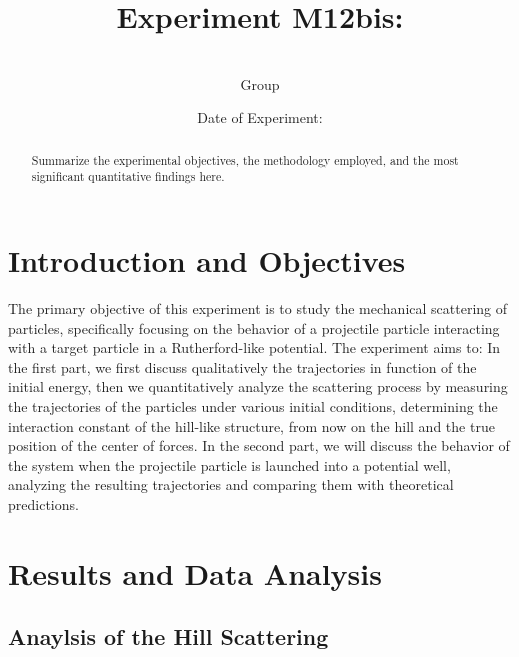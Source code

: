 \documentclass[a4paper,11pt]{article}
\title{\textbf{Experiment M12bis: \experimentTitle}}
\author{\authorName \\ Group \groupNumber}
\date{Date of Experiment: \experimentDate}
\begin{document}
\maketitle

\begin{abstract}
    Summarize the experimental objectives, the methodology employed, and the most significant quantitative findings here.
\end{abstract}

\tableofcontents
\newpage

\section{Introduction and Objectives}
The primary objective of this experiment is to study the mechanical scattering of particles, specifically focusing on the behavior of a projectile particle interacting with a target particle in a Rutherford-like potential. The experiment aims to:
In the first part, we first discuss qualitatively the trajectories in function of the initial energy, then we quantitatively analyze the scattering process by measuring the trajectories of the particles under various initial conditions, determining the interaction constant of the hill-like structure, from now on the hill and the true position of the center of forces.
In the second part, we will discuss the behavior of the system when the projectile particle is launched into a potential well, analyzing the resulting trajectories and comparing them with theoretical predictions.


\section{Results and Data Analysis}

\subsection{Anaylsis of the Hill Scattering}
\end{document}
